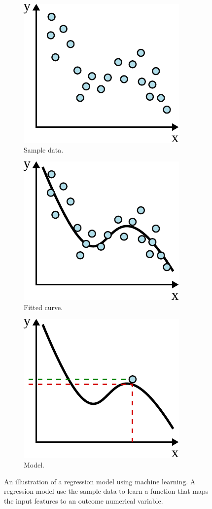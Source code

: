 \begin{figure}[h]
  \centering
  \begin{subfigure}{.32\textwidth}
    \center
    \includegraphics[scale=0.8]{src/background/figs/ml-regression-sample}
    \caption{Sample data.}
    \label{fig:ml-regression-sample}
  \end{subfigure}
  \begin{subfigure}{.32\textwidth}
    \center
    \includegraphics[scale=0.8]{src/background/figs/ml-regression-fitted}
    \caption{Fitted curve.}
    \label{fig:ml-regression-fitted}
  \end{subfigure}
  \begin{subfigure}{.32\textwidth}
    \center
    \includegraphics[scale=0.8]{src/background/figs/ml-regression-model}
    \caption{Model.}
    \label{fig:ml-regression-model}
  \end{subfigure}
  \caption{
    An illustration of a regression model using machine learning.
    A regression model use the sample data to learn a function that maps the input features to an outcome numerical variable.
  }
  \label{fig:ml-regression}
\end{figure}


